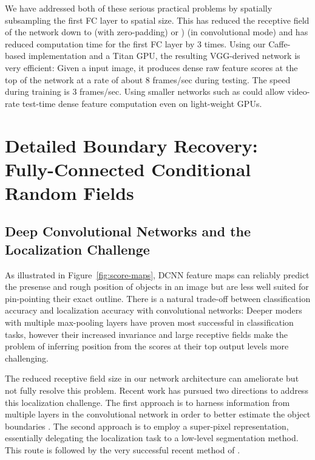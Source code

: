 We have addressed both of these serious practical problems by spatially
subsampling the first FC layer to  spatial size. This has reduced the
receptive field of the network down to  (with zero-padding) or
) (in convolutional mode) and has reduced computation time for
the first FC layer by 3 times. Using our Caffe-based implementation and a
Titan GPU, the resulting VGG-derived network is very efficient: Given a
 input image, it produces  dense raw feature scores at
the top of the network at a rate of about 8 frames/sec during testing. The
speed during training is 3 frames/sec. Using smaller networks such as
\cite{KrizhevskyNIPS2013} could allow video-rate test-time dense feature
computation even on light-weight GPUs.

\section{Detailed Boundary Recovery: Fully-Connected Conditional Random Fields}
\label{sec:boundary-recovery}

\subsection{Deep Convolutional Networks and the Localization Challenge}
\label{sec:local-chal}

As illustrated in Figure~\ref{fig:score-maps}, DCNN feature maps can
reliably predict the presense and rough position of objects in an image but
are less well suited for pin-pointing their exact outline. There is a natural
trade-off between classification accuracy and localization accuracy with
convolutional networks: Deeper moders with multiple max-pooling layers have
proven most successful in classification tasks, however their increased
invariance and large receptive fields make the problem of inferring position
from the scores at their top output levels more challenging.

The reduced receptive field size in our network architecture can ameliorate
but not fully resolve this problem. Recent work has pursued two directions to
address this localization challenge. The first approach is to harness
information from multiple layers in the convolutional network in order to
better estimate the object boundaries \citep{long2014fully, eigen2014predicting}. The second approach is
to employ a super-pixel representation, essentially delegating the
localization task to a low-level segmentation method. This route is followed
by the very successful recent method of \cite{mostajabi2014feedforward}.

